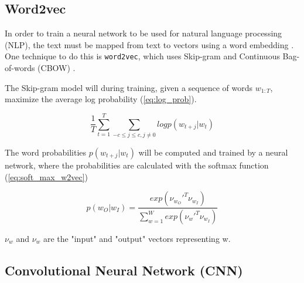 \documentclass[twocolumn]{article}
\begin{document}
\subsection{Word2vec}

In order to train a neural network to be used for natural language processing (NLP), the text must be mapped from text to vectors using a word embedding \cite{Lec}. One technique to do this is \verb|word2vec|, which uses Skip-gram and Continuous Bag-of-words (CBOW) \cite{Lec}. 

The Skip-gram model will during training, given a sequence of words $w_{1:T}$, maximize the average log probability (\ref{eq:log_prob}). \cite{Mikolov}

\begin{equation}
\label{eq:log_prob}
\frac{1}{T} \sum_{t=1}^T \sum_{-c \leq j \leq c, j \neq 0} log p(w_{t+j}|w_t)
\end{equation}

The word probabilities $p(w_{t+j}|w_t)$ will be computed and trained by a neural network, where the probabilities are calculated with the softmax function (\ref{eq:soft_max_w2vec})

\begin{equation}
\label{eq:soft_max_w2vec}
p(w_O|w_I) = \frac{exp({\nu_{w_O}'}^T\nu_{w_I})}{\sum_{w=1}^Wexp({\nu_{w}'}^T\nu_{w_I})}
\end{equation}

$\nu_w$ and $\nu_w$ are the "input" and "output" vectors representing w.


\subsection{Convolutional Neural Network (CNN)}
\end{document}
